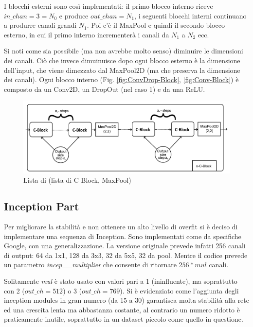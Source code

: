 \documentclass[target=mst]{thud}
\begin{document}
I blocchi esterni sono così implementati: il primo blocco interno riceve $in\_chan=3=N_0$ e produce $out\_chan=N_1$, i seguenti blocchi interni continuano a produrre canali grandi $N_1$.
Poi c'è il MaxPool e quindi il secondo blocco esterno, in cui il primo interno incrementerà i canali da $N_1$ a $N_2$ ecc.

Si noti come sia possibile (ma non avrebbe molto senso) diminuire le dimensioni dei canali. Ciò che invece dimuinuisce dopo ogni blocco esterno è la dimensione dell'input, che viene dimezzato dal MaxPool2D (ma che preserva la dimensione dei canali).
Ogni blocco interno (Fig. \ref{fig:ConvDrop-Block}, \ref{fig:Conv-Block}) è composto da un Conv2D, un DropOut (nel caso 1) e da una ReLU.

\begin{figure}[H]
    \centering
    \includegraphics[scale=0.6]{SequenceOfC-Block.png}
    \caption{Lista di (lista di C-Block, MaxPool)}
    \label{fig:SequenceOfC-Block}
\end{figure}

\subsection{Inception Part}
Per migliorare la stabilità e non ottenere un alto livello di overfit si è deciso di implementare una sequenza di Inception. Sono implementati come da specifiche Google, con una generalizzazione.
La versione originale prevede infatti 256 canali di output: 64 da 1x1, 128 da 3x3, 32 da 5x5, 32 da pool. Mentre il codice prevede un parametro \textit{incep\_\_multiplier} che consente di ritornare $256 * mul$ canali.

Solitamente \textit{mul} è stato usato con valori pari a 1 (ininfluente), ma soprattutto con 2 ($out\_ch=512$) o 3 ($out\_ch=769$).
Si è evidenziato come l'aggiunta degli inception modules in gran numero (da 15 a 30) garantisca molta stabilità alla rete ed una crescita lenta ma abbastanza costante, al contrario un numero ridotto è praticamente inutile, soprattutto in un dataset piccolo come quello in questione.
\end{document}
